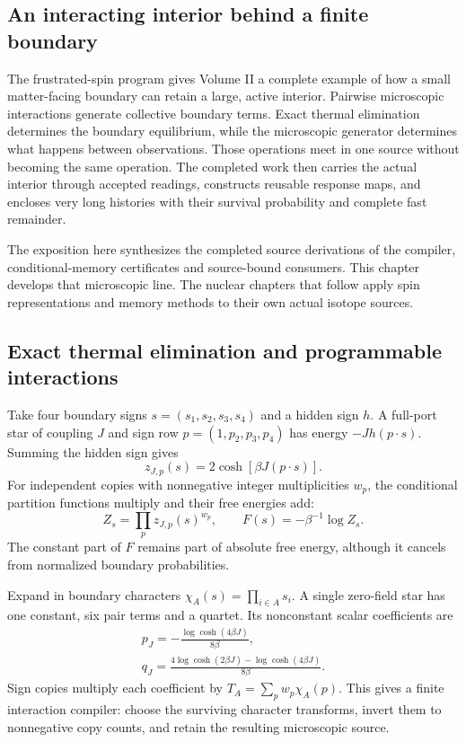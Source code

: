 \label{ch:spin-microscopic}

\subsection{An interacting interior behind a finite boundary}

The frustrated-spin program gives Volume II a complete example of how a
small matter-facing boundary can retain a large, active interior. Pairwise
microscopic interactions generate collective boundary terms. Exact thermal
elimination determines the boundary equilibrium, while the microscopic
generator determines what happens between observations. Those operations
meet in one source without becoming the same operation. The completed work
then carries the actual interior through accepted readings, constructs
reusable response maps, and encloses very long histories with their
survival probability and complete fast remainder.

The exposition here synthesizes the completed source derivations of the
compiler, conditional-memory certificates and source-bound consumers.
This chapter develops that microscopic line.
The nuclear chapters that follow apply spin representations and memory
methods to their own actual isotope sources.

\subsection{Exact thermal elimination and programmable interactions}

Take four boundary signs \(s=(s_1,s_2,s_3,s_4)\) and a hidden sign \(h\).
A full-port star of coupling \(J\) and sign row \(p=(1,p_2,p_3,p_4)\) has
energy \(-Jh(p\cdot s)\). Summing the hidden sign gives
\[
 z_{J,p}(s)=2\cosh[\beta J(p\cdot s)].
\]
For independent copies with nonnegative integer multiplicities \(w_p\),
the conditional partition functions multiply and their free energies add:
\[
 Z_s=\prod_pz_{J,p}(s)^{w_p},\qquad
 F(s)=-\beta^{-1}\log Z_s.
\]
The constant part of \(F\) remains part of absolute free energy, although
it cancels from normalized boundary probabilities.

Expand in boundary characters \(\chi_A(s)=\prod_{i\in A}s_i\). A single
zero-field star has one constant, six pair terms and a quartet. Its
nonconstant scalar coefficients are
\[
\begin{gathered}
p_J=-\frac{\log\cosh(4\beta J)}{8\beta},\\
q_J=\frac{4\log\cosh(2\beta J)-\log\cosh(4\beta J)}{8\beta}.
\end{gathered}
\]
Sign copies multiply each coefficient by
\(T_A=\sum_pw_p\chi_A(p)\). This gives a finite interaction compiler:
choose the surviving character transforms, invert them to nonnegative
copy counts, and retain the resulting microscopic source.

